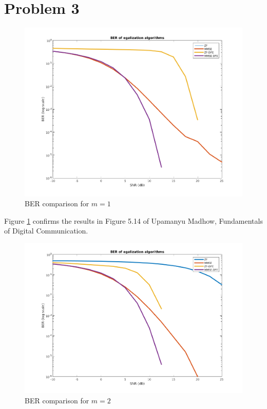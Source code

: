 \documentclass[a4paper]{article}
\begin{document}
\section{Problem 3}

\begin{figure}[ht!]
\centering
\begin{center}
\includegraphics[scale=0.50]{BER-m1.png}
\caption{BER comparison for $m=1$}
\label{m1}
\end{center}
\end{figure}

Figure \ref{m1} confirms the results in Figure 5.14 of Upamanyu Madhow, Fundamentals of Digital Communication.

\begin{figure}[ht!]
\centering
\begin{center}
\includegraphics[scale=0.50]{BER-m2.png}
\caption{BER comparison for $m=2$}
\label{m2}
\end{center}
\end{figure}

\end{document}

